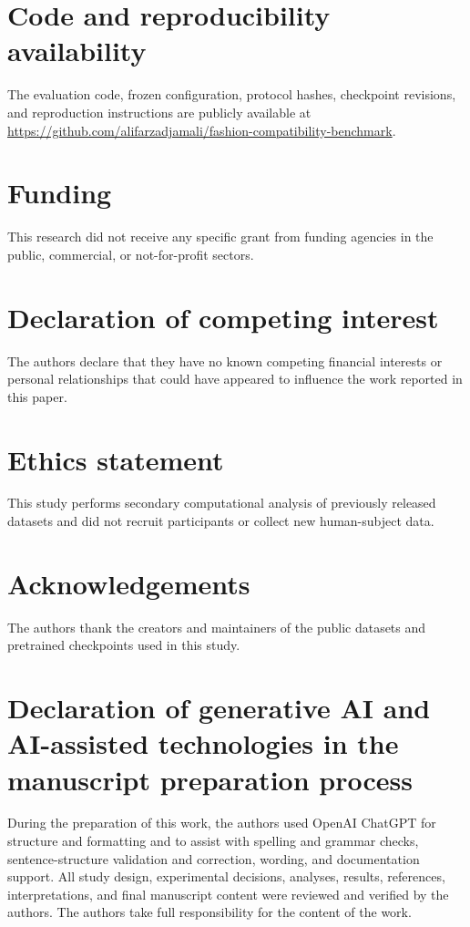 \documentclass[preprint,12pt]{elsarticle}
\begin{document}
\section*{Code and reproducibility availability}
The evaluation code, frozen configuration, protocol hashes, checkpoint revisions, and reproduction instructions are publicly available at \url{https://github.com/alifarzadjamali/fashion-compatibility-benchmark}.

\section*{Funding}
This research did not receive any specific grant from funding agencies in the public, commercial, or not-for-profit sectors.

\section*{Declaration of competing interest}
The authors declare that they have no known competing financial interests or personal relationships that could have appeared to influence the work reported in this paper.

\section*{Ethics statement}
This study performs secondary computational analysis of previously released datasets and did not recruit participants or collect new human-subject data.

\section*{Acknowledgements}
The authors thank the creators and maintainers of the public datasets and pretrained checkpoints used in this study.

\section*{Declaration of generative AI and AI-assisted technologies in the manuscript preparation process}
During the preparation of this work, the authors used OpenAI ChatGPT for structure and formatting and to assist with spelling and grammar checks, sentence-structure validation and correction, wording, and documentation support. All study design, experimental decisions, analyses, results, references, interpretations, and final manuscript content were reviewed and verified by the authors. The authors take full responsibility for the content of the work.

\sloppy


\end{document}
